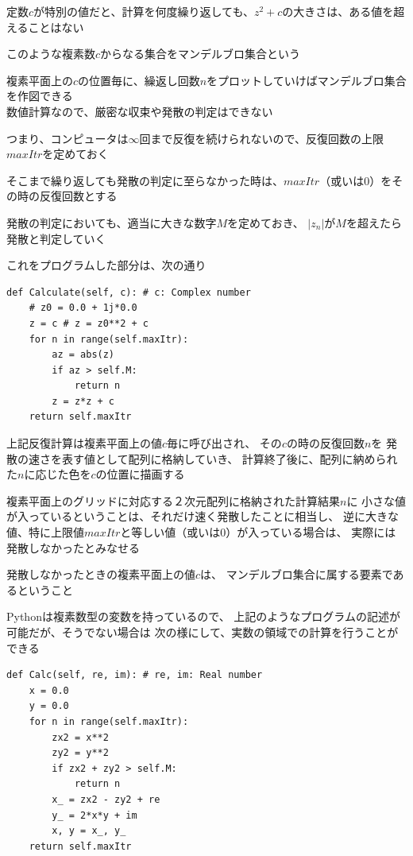 \documentclass[uplatex,a4paper,11pt,oneside,openany]{jsbook}
\begin{document}
定数$c$が特別の値だと、計算を何度繰り返しても、$z^2+c$の大きさは、ある値を超えることはない

このような複素数$c$からなる集合をマンデルブロ集合という

複素平面上の$c$の位置毎に、繰返し回数$n$をプロットしていけばマンデルブロ集合を作図できる\\

数値計算なので、厳密な収束や発散の判定はできない

つまり、コンピュータは$\infty$回まで反復を続けられないので、反復回数の上限$maxItr$を定めておく

そこまで繰り返しても発散の判定に至らなかった時は、$maxItr$（或いは$0$）をその時の反復回数とする

発散の判定においても、適当に大きな数字$M$を定めておき、
$|z_n|$が$M$を超えたら発散と判定していく

これをプログラムした部分は、次の通り

\begin{lstlisting}[caption=複素数で計算,label=p1]
def Calculate(self, c): # c: Complex number
    # z0 = 0.0 + 1j*0.0
    z = c # z = z0**2 + c
    for n in range(self.maxItr):
        az = abs(z)
        if az > self.M:
            return n
        z = z*z + c
    return self.maxItr
\end{lstlisting}

上記反復計算は複素平面上の値$c$毎に呼び出され、
その$c$の時の反復回数$n$を
発散の速さを表す値として配列に格納していき、
計算終了後に、配列に納められた$n$に応じた色を$c$の位置に描画する

複素平面上のグリッドに対応する２次元配列に格納された計算結果$n$に
小さな値が入っているということは、それだけ速く発散したことに相当し、
逆に大きな値、特に上限値$maxItr$と等しい値（或いは$0$）が入っている場合は、
実際には発散しなかったとみなせる

発散しなかったときの複素平面上の値$c$は、
マンデルブロ集合に属する要素であるということ

Pythonは複素数型の変数を持っているので、
上記のようなプログラムの記述が可能だが、そうでない場合は
次の様にして、実数の領域での計算を行うことができる

\begin{lstlisting}[caption=実数で計算,label=p2]
def Calc(self, re, im): # re, im: Real number
    x = 0.0
    y = 0.0
    for n in range(self.maxItr):
        zx2 = x**2
        zy2 = y**2
        if zx2 + zy2 > self.M:
            return n
        x_ = zx2 - zy2 + re
        y_ = 2*x*y + im
        x, y = x_, y_
    return self.maxItr
\end{lstlisting}
\end{document}
